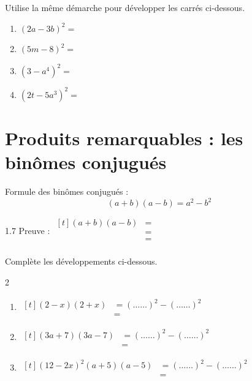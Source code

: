 \documentclass[../math2.tex]{subfiles}
\begin{document}
\begin{exercise}
  Utilise la même démarche pour développer les carrés ci-dessous.
  \begin{enumerate}[cols=2, itemsep=2cm]
    \item $\left(2a-3b\right)^2=$
    \item $\left(5m-8\right)^2=$
    \item $\left(3-a^4\right)^2=$
    \item $\left(2t - 5a^3\right)^2=$
  \end{enumerate}
\end{exercise}

\newpage
\section{Produits remarquables : les binômes conjugués}

Formule des binômes conjugués :
\begin{equation*}
  \left(a+b\right)\left(a-b\right)=a^2-b^2
\end{equation*}

\begin{spacing}{1.7}
  Preuve : $
    \begin{aligned}[t]
      \left(a+b\right)\left(a-b\right)
       & = \\
       & = \\
       & = \\
    \end{aligned}
  $
\end{spacing}

\begin{exercise}
  Complète les développements ci-dessous.
  \begin{spacing}{2}
    \begin{enumerate}[itemsep=0.5cm]
      \item $
              \begin{aligned}[t]
                \left(2-x\right)\left(2+x\right)
                 & = \left( \ldots \ldots \right)^2 - \left( \ldots \ldots \right)^2 \\
                 & =
              \end{aligned}
            $
      \item $
              \begin{aligned}[t]
                \left(3a+7\right)\left(3a-7\right)
                 & = \left( \ldots \ldots \right)^2 - \left( \ldots \ldots \right)^2 \\
                 & =
              \end{aligned}
            $
      \item $
              \begin{aligned}[t]
                \left(12-2x\right)^2
                \left(a+5\right)\left(a-5\right)
                 & = \left( \ldots \ldots \right)^2 - \left( \ldots \ldots \right)^2 \\
                 & =
              \end{aligned}
            $
    \end{enumerate}
  \end{spacing}
\end{exercise}
\end{document}

